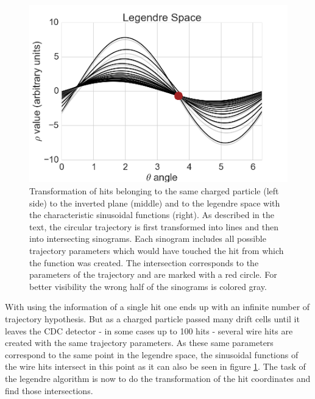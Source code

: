 \begin{figure}
 \includegraphics[scale=0.15]{figures/theory/legendre_3.png}
 \caption[Axial legendre algorithm.]{Transformation of hits belonging to the same charged particle (left side) to the inverted plane (middle) and to the legendre space with the characteristic sinusoidal functions (right). As described in the text, the circular trajectory is first transformed into lines and then into intersecting sinograms. Each sinogram includes all possible trajectory parameters which would have touched the hit from which the function was created. The intersection corresponds to the parameters of the trajectory and are marked with a red circle. For better visibility the wrong half of the sinograms is colored gray.}
 \label{fig-legendre-explained}
\end{figure}

With using the information of a single hit one ends up with an infinite number of trajectory hypothesis. But as a charged particle passed many drift cells until it leaves the CDC detector - in some cases up to 100 hits - several wire hits are created with the same trajectory parameters. As these same parameters correspond to the same point in the legendre space, the sinusoidal functions of the wire hits intersect in this point as it can also be seen in figure \ref{fig-legendre-explained}. The task of the legendre algorithm is now to do the transformation of the hit coordinates and find those intersections.

